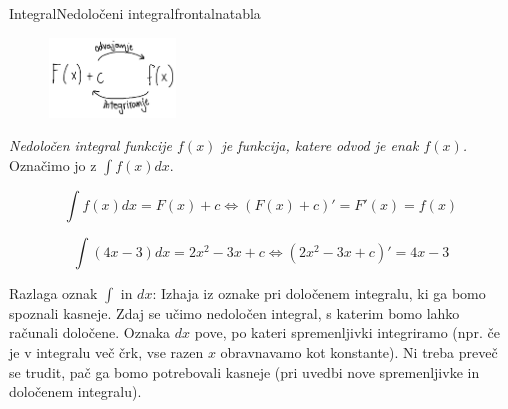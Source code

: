 \begin{priprava}{}{}{Integral}{Nedoločeni integral}{frontalna}{tabla}

\newpage


\begin{figure}[h]
    \centering
    \includegraphics[width=0.3\textwidth]{slike/povezava_F(x)_f(x).png}
\end{figure}


\emph{Nedoločen integral funkcije $ f(x) $ je funkcija, katere odvod je enak $ f(x) $.} Označimo jo z $ \int f(x) dx $.

$$
    \int f(x) dx = F(x) + c \Longleftrightarrow (F(x) + c)' = F'(x) = f(x)
$$


$$
    \int (4x - 3) dx = 2x^2 - 3x + c \Longleftrightarrow (2x^2 - 3x + c)' = 4x - 3
$$

\textcolor{rdeca}{Razlaga oznak $ \int $ in $ dx $:} Izhaja iz oznake pri določenem integralu, ki ga bomo spoznali kasneje. Zdaj se učimo nedoločen integral, s katerim bomo lahko računali določene. Oznaka $ dx $ pove, po kateri spremenljivki integriramo (npr. če je v integralu več črk, vse razen $ x $ obravnavamo kot konstante). Ni treba preveč se trudit, pač ga bomo potrebovali kasneje (pri uvedbi nove spremenljivke in določenem integralu).




\end{priprava}
